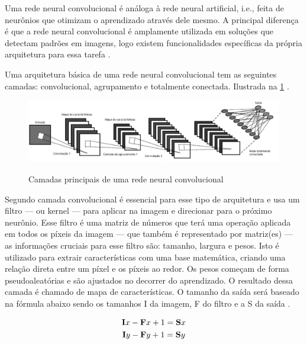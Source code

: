 
Uma rede neural convolucional é análoga à rede neural artificial, i.e., feita de neurônios que otimizam o aprendizado através dele mesmo. A principal diferença é que a rede neural convolucional é amplamente utilizada em soluções que detectam padrões em imagens, logo existem funcionalidades específicas da própria arquitetura para essa tarefa \space\cite{oshea2015introduction}.

Uma arquitetura básica de uma rede neural convolucional tem as seguintes camadas: convolucional, agrupamento e totalmente conectada. Ilustrada na \cref{fig:arquitetura_cnn} \space\cite{dp_overview}.

\begin{figure}[ht]
	\caption{Camadas principais de uma rede neural convolucional}
	\centering %
	\includegraphics[width=15cm]{figures/arquitetura_cnn.png} %
	\label{fig:arquitetura_cnn}
\end{figure}


Segundo  camada convolucional é essencial para esse tipo de arquitetura e usa um filtro — ou kernel — para aplicar na imagem e direcionar para o próximo neurônio. Esse filtro é uma matriz de números que terá uma operação aplicada em todos os píxeis da imagem — que também é representado por matriz(es) — as informações cruciais para esse filtro são: tamanho, largura e pesos. Isto é utilizado para extrair características com uma base matemática, criando uma relação direta entre um píxel e os píxeis ao redor. Os pesos começam de forma pseudoaleatórias e são ajustados no decorrer do aprendizado. O resultado dessa camada é chamado de mapa de características. O tamanho da saída será baseado na fórmula abaixo sendo os tamanhos I da imagem, F do filtro e a S da saída \space\cite{computation11030052}.

\begin{gather}
    \mathbf{I}x - \mathbf{F}x + 1 = \mathbf{S}x \notag \\
    \mathbf{I}y - \mathbf{F}y + 1 = \mathbf{S}y
\end{gather}



